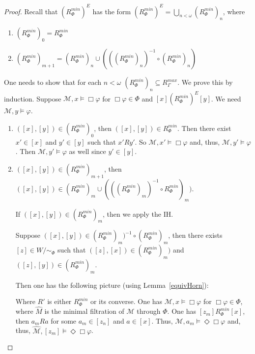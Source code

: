 \documentclass[a4paper]{article}
\theoremstyle{defin}
\theoremstyle{theorem}
\theoremstyle{prop}
\theoremstyle{lemma}
\theoremstyle{ex}
\theoremstyle{col}
\begin{document}
\begin{proof}
  Recall that $(R^{min}_{\Phi})^{E}$ has the form $(R^{min}_{\Phi})^{E} = \bigcup \limits_{n < \omega} (R^{min}_{\Phi})_n$, where
  \begin{enumerate}
    \item $(R^{min}_{\Phi})_0 = R^{min}_{\Phi}$
    \item $(R^{min}_{\Phi})_{m + 1} = (R^{min}_{\Phi})_n \cup (((R^{min}_{\Phi})_n)^{-1} \circ (R^{min}_{\Phi})_n)$
  \end{enumerate}
  One needs to show that for each $n < \omega$ $(R^{min}_{\Phi})_n \subseteq R^{max}_{\Gamma}$. We prove this by induction.
  Suppose $\mathcal{M}, x \models \Box \varphi$ for $\Box \varphi \in \Phi$ and $[x] (R^{min}_{\Phi})^{E} [y]$. We need $\mathcal{M}, y \models \varphi$.
  \begin{enumerate}
    \item $([x], [y]) \in (R^{min}_{\Phi})_0$, then $([x], [y]) \in R^{min}_{\Phi}$. Then there exist $x' \in [x]$ and $y' \in [y]$ such that $x' R y'$. So $\mathcal{M}, x' \models \Box \varphi$ and, thus,
    $\mathcal{M}, y' \models \varphi$. Then $\mathcal{M}, y' \models \varphi$ as well since $y' \in [y]$.
    \item $([x], [y]) \in (R^{min}_{\Phi})_{m + 1}$, then
    $([x], [y]) \in (R^{min}_{\Phi})_{m} \cup (((R^{min}_{\Phi})_{m})^{-1} \circ R^{min}_{\Phi})_{m})$.

    If $([x], [y]) \in (R^{min}_{\Phi})_{m}$, then we apply the IH.

    Suppose $([x], [y]) \in (R^{min}_{\Phi})_{m})^{-1} \circ (R^{min}_{\Phi})_{m}$,
    then there exists $[z] \in W / \sim_{\Phi}$ such that $([z], [x]) \in (R^{min}_{\Phi})_{m})$ and $([z], [y]) \in (R^{min}_{\Phi})_{m}$.

    Then one has the following picture (using Lemma~\ref{equivHorn}):

  Where $R'$ is either $R^{min}_{\Phi}$ or its converse.
  One has $\mathcal{M}, x \models \Box \varphi$ for $\Box \varphi \in \Phi$, where $\widehat{M}$ is the minimal filtration of $\mathcal{M}$ through $\Phi$. One has $[z_m] R^{min}_{\Phi} [x]$, then $a_m R a$ for some $a_m \in [z_n]$ and $a \in [x]$. Thus, $\mathcal{M}, a_m \models \Diamond \Box \varphi$ and, thus, $\widehat{\mathcal{M}}, [z_m] \models \Diamond \Box \varphi$.


\end{enumerate}
\end{proof}
\end{document}
